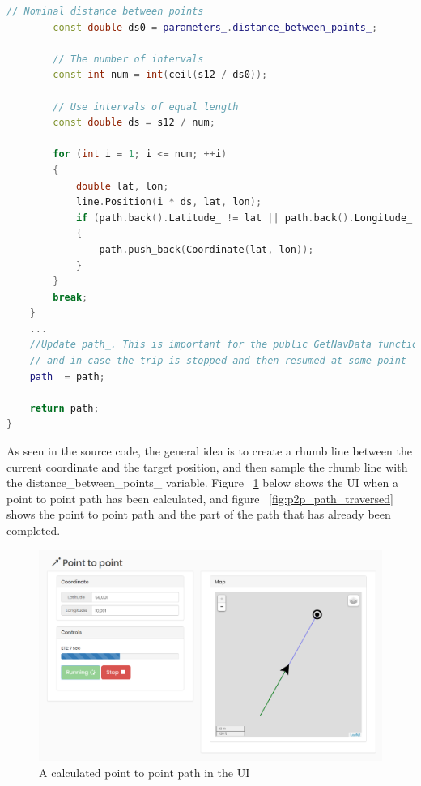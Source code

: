 \begin{lstlisting}[caption = {Function responsible for calculating a P2P path}, captionpos=b, label={lst:calculateP2PPath}, language=C++,firstnumber=1]
		// Nominal distance between points
		const double ds0 = parameters_.distance_between_points_;

		// The number of intervals
		const int num = int(ceil(s12 / ds0));

		// Use intervals of equal length
		const double ds = s12 / num;

		for (int i = 1; i <= num; ++i)
		{
			double lat, lon;
			line.Position(i * ds, lat, lon);
			if (path.back().Latitude_ != lat || path.back().Longitude_ != lon) //Check for duplicates
			{
				path.push_back(Coordinate(lat, lon));
			}
		}
		break;
	}
	...
	//Update path_. This is important for the public GetNavData function,
	// and in case the trip is stopped and then resumed at some point
	path_ = path;
	
	return path;
}
\end{lstlisting}

As seen in the source code, the general idea is to create a rhumb line between the current coordinate and the target position, and then sample the rhumb line with the distance_between_points_ variable. Figure ~\ref{fig:p2p_path} below shows the UI when a point to point path has been calculated, and figure ~\ref{fig:p2p_path_traversed} shows the point to point path and the part of the path that has already been completed.

\begin{figure}[H]
\centering
\includegraphics[width=0.9\linewidth]{Images/Implementation/P2P_path_being_traversed}
\caption{A calculated point to point path in the UI}
\label{fig:p2p_path}
\end{figure}


